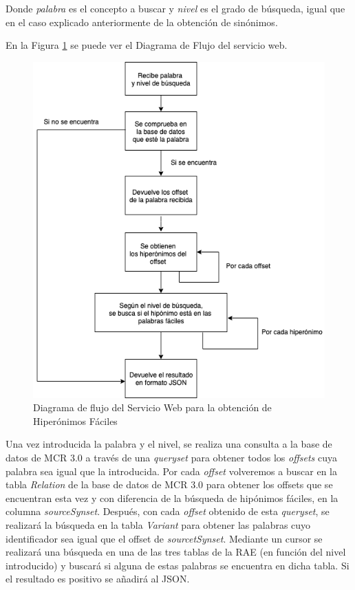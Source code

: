 Donde \textit{palabra} es el concepto a buscar y \textit{nivel} es el grado de búsqueda, igual que en el caso explicado anteriormente de la obtención de sinónimos.

En la Figura \ref{fig:swhiperonimos} se puede ver el Diagrama de Flujo del servicio web.
\begin{figure}[!h]
	\includegraphics[width=.9\textwidth]{Imagenes/Bitmap/Capitulo4/ServiciosWeb/DiagramaFlujoHiperonimos.png}
	\centering
	\caption{Diagrama de flujo del Servicio Web para la obtención de Hiperónimos Fáciles}
	\label{fig:swhiperonimos}
\end{figure}

Una vez introducida la palabra y el nivel, se realiza una consulta a la base de datos de MCR 3.0 a través de una \textit{queryset} para obtener todos los \textit{offsets} cuya palabra sea igual que la introducida.
Por cada \textit{offset} volveremos a buscar en la tabla \textit{Relation} de la base de datos de MCR 3.0 para obtener los offsets que se encuentran esta vez y con diferencia de la búsqueda de hipónimos fáciles, en la columna \textit{sourceSynset}. Después, con cada \textit{offset} obtenido de esta \textit{queryset}, se realizará la búsqueda en la tabla \textit{Variant} para obtener las palabras cuyo identificador sea igual que el offset de \textit{sourcetSynset}.
Mediante un cursor se realizará una búsqueda en una de las tres tablas de la RAE (en función del nivel introducido) y buscará si alguna de estas palabras se encuentra en dicha tabla.
Si el resultado es positivo se añadirá al JSON.

